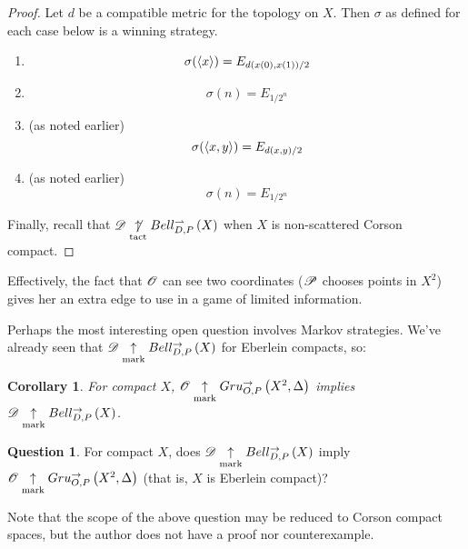 \documentclass{amsart}
\newtheorem{corollary}[theorem]{Corollary}
\theoremstyle{definition}
\newtheorem{question}[theorem]{Question}
\begin{document}
  \begin{proof}
    Let \(d\) be a compatible metric for the topology on \(X\).
    Then \(\sigma\) as defined for each case below is a winning strategy.
    \begin{enumerate}
      \item
        \[
          \sigma(\langle x\rangle)
            =
          E_{d(x(0),x(1))/2}
        \]
      \item
        \[
          \sigma(n)
            =
          E_{1/2^n}
        \]
      \item (as noted earlier)
        \[
          \sigma(\langle x,y\rangle)
            =
          E_{d(x,y)/2}
        \]
      \item (as noted earlier)
        \[
          \sigma(n)
            =
          E_{1/2^n}
        \]
    \end{enumerate}
    Finally, recall that \(\mathscr{D}\underset{\text{tact}}{\not\uparrow}Bell_{D,P}^{\rightharpoonup}\left({X}\right)\)
    when \(X\) is non-scattered Corson compact.
  \end{proof}

  Effectively, the fact that \(\mathscr{O}\) can see two coordinates (\(\mathscr{P}\)
  chooses points in \(X^2\)) gives her an extra edge to use in a game
  of limited information.

  Perhaps the most interesting open question involves Markov strategies.
  We've already seen that \(\mathscr{D}\underset{\text{mark}}{\uparrow}Bell_{D,P}^{\to}\left({X}\right)\) for Eberlein
  compacts, so:

  \begin{corollary}
    For compact \(X\),
    \(\mathscr{O}\underset{\text{mark}}{\uparrow}Gru_{O,P}^{\to}\left({X^2},{\Delta}\right)\) implies
    \(\mathscr{D}\underset{\text{mark}}{\uparrow}Bell_{D,P}^{\to}\left({X}\right)\).
  \end{corollary}

  \begin{question}
    For compact \(X\),
    does \(\mathscr{D}\underset{\text{mark}}{\uparrow}Bell_{D,P}^{\to}\left({X}\right)\) imply
    \(\mathscr{O}\underset{\text{mark}}{\uparrow}Gru_{O,P}^{\to}\left({X^2},{\Delta}\right)\) (that is,
    \(X\) is Eberlein compact)?
  \end{question}

  Note that the scope of the above question may be reduced to Corson
  compact spaces, but the author does not have a proof nor counterexample.



\end{document}
